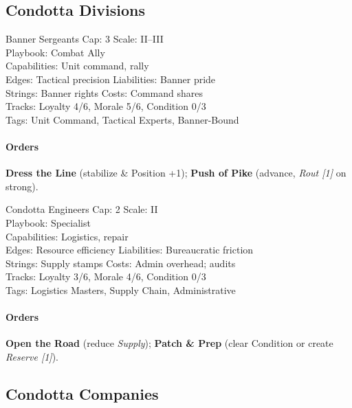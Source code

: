 \documentclass[11pt]{article}
\begin{document}
\subsection{Condotta Divisions}

\begin{followerbox}{Banner Sergeants}
Cap: 3 \quad Scale: II--III \\
Playbook: Combat Ally \\
Capabilities: Unit command, rally \\
Edges: Tactical precision \quad Liabilities: Banner pride \\
Strings: Banner rights \quad Costs: Command shares \\
Tracks: Loyalty 4/6, Morale 5/6, Condition 0/3 \\
Tags: Unit Command, Tactical Experts, Banner-Bound
\paragraph{Orders}
\textbf{Dress the Line} (stabilize \& Position +1); \textbf{Push of Pike} (advance, \emph{Rout [1]} on strong).
\end{followerbox}

\begin{followerbox}{Condotta Engineers}
Cap: 2 \quad Scale: II \\
Playbook: Specialist \\
Capabilities: Logistics, repair \\
Edges: Resource efficiency \quad Liabilities: Bureaucratic friction \\
Strings: Supply stamps \quad Costs: Admin overhead; audits \\
Tracks: Loyalty 3/6, Morale 4/6, Condition 0/3 \\
Tags: Logistics Masters, Supply Chain, Administrative
\paragraph{Orders}
\textbf{Open the Road} (reduce \emph{Supply}); \textbf{Patch \& Prep} (clear Condition or create \emph{Reserve [1]}).
\end{followerbox}

\subsection{Condotta Companies}
\end{document}
